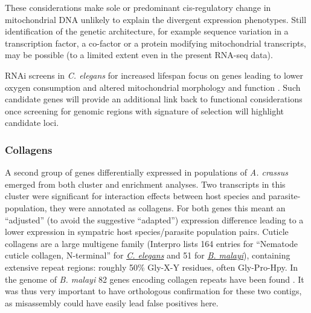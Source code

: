 \documentclass[10pt]{article}
\begin{document}
These considerations make sole or predominant cis-regulatory change in
mitochondrial DNA unlikely to explain the divergent expression
phenotypes. Still identification of the genetic architecture, for
example sequence variation in a transcription factor, a co-factor or a
protein modifying mitochondrial transcripts, may be possible (to a
limited extent even in the present RNA-seq data).

RNAi screens in \textit{C. elegans} for increased lifespan focus on
genes leading to lower oxygen consumption and altered mitochondrial
morphology and function \cite{pmid12447374}. Such candidate genes will
provide an additional link back to functional considerations once
screening for genomic regions with signature of selection will
highlight candidate loci.




\subsubsection{Collagens}
\label{sec:collagens}

A second group of genes differentially expressed in populations of
\textit{A. crassus} emerged from both cluster and enrichment
analyses. Two transcripts in this cluster were significant for
interaction effects between host species and parasite-population, they
were annotated as collagens. For both genes this meant an ``adjusted''
(to avoid the suggestive ``adapted'') expression difference leading to
a lower expression in sympatric host species/parasite population
pairs. Cuticle collagens are a large multigene family (Interpro lists
164 entries for ``Nematode cuticle collagen, N-terminal'' for
\href{http://www.ebi.ac.uk/interpro/ISpy?ipr=IPR002486&tax=6239}{\textit{C. elegans}}
and 51 for
\href{http://www.ebi.ac.uk/interpro/ISpy?ipr=IPR002486&tax=6279}{\textit{B. malayi}}),
containing extensive repeat regions: roughly 50\% Gly-X-Y residues,
often Gly-Pro-Hpy. In the genome of \textit{B. malayi} 82 genes
encoding collagen repeats have been found \cite{ghedin_draft_2007}. It
was thus very important to have orthologous confirmation for these two
contigs, as misassembly could have easily lead false positives here.
\end{document}
